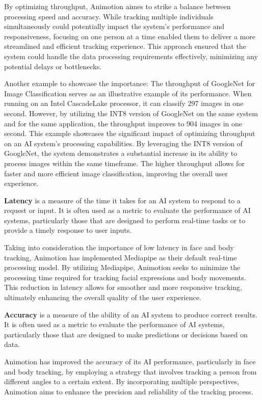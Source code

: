 By optimizing throughput, Animotion aimes to strike a balance between processing speed and accuracy. 
While tracking multiple individuals simultaneously could potentially impact the system's performance 
and responsiveness, focusing on one person at a time enabled them to deliver a more streamlined and 
efficient tracking experience. This approach ensured that the system could handle the data processing 
requirements effectively, minimizing any potential delays or bottlenecks.

Another example to showcase the importance: The throughput of GoogleNet for Image Classification serves as an illustrative example 
of its performance. When running on an Intel CascadeLake processor, it can classify 297 images in one second. 
However, by utilizing the INT8 version of GoogleNet on the same system and for the same application, 
the throughput improves to 904 images in one second.
This example showcases the significant impact of optimizing throughput on an 
AI system's processing capabilities. By leveraging the INT8 version of GoogleNet, 
the system demonstrates a substantial increase in its ability to process images 
within the same timeframe. The higher throughput allows for faster and more efficient image 
classification, improving the overall user experience.\cite{throughput}

\textbf{Latency} is a measure of the time it takes for an AI system to respond to a request or input.
It is often used as a metric to evaluate the performance of AI systems, particularly those that 
are designed to perform real-time tasks or to provide a timely response to user inputs.

Taking into consideration the importance of low latency in face and body tracking, 
Animotion has implemented Mediapipe as their default real-time processing model. 
By utilizing Mediapipe, Animotion seeks to minimize the processing time required for 
tracking facial expressions and body movements. This reduction in latency allows for smoother 
and more responsive tracking, ultimately enhancing the overall quality of the user experience.

\textbf{Accuracy} is a measure of the ability of an AI system to produce correct results.
It is often used as a metric to evaluate the performance of AI systems, particularly
those that are designed to make predictions or decisions based on data.

Animotion has improved the accuracy of its AI performance, particularly in face and body 
tracking, by employing a strategy that involves tracking a person from different angles 
to a certain extent. By incorporating multiple perspectives, Animotion aims to enhance the 
precision and reliability of the tracking process.

